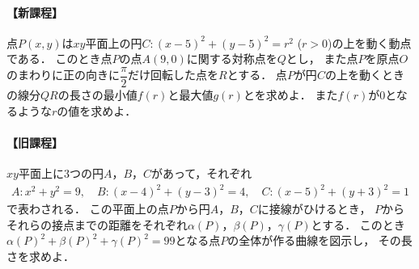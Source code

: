 \documentclass[../../main.tex]{subfiles}
\begin{document}
\paragraph{【新課程】}
点$P(x,y)$は$xy$平面上の円$C:(x-5)^2+(y-5)^2=r^2$ ($r>0$)の上を動く動点である．
このとき点$P$の点$A(9,0)$に関する対称点を$Q$とし，
また点$P$を原点$O$のまわりに正の向きに$\dfrac{\pi}{2}$だけ回転した点を$R$とする．
点$P$が円$C$の上を動くときの線分$QR$の長さの最小値$f(r)$と最大値$g(r)$とを求めよ．
また$f(r)$が$0$となるような$r$の値を求めよ．

\paragraph{【旧課程】}
$xy$平面上に3つの円$A$，$B$，$C$があって，それぞれ
\begin{align}
  A:x^2+y^2=9, \quad B:(x-4)^2+(y-3)^2=4, \quad C:(x-5)^2+(y+3)^2=1
\end{align}
で表わされる．
この平面上の点$P$から円$A$，$B$，$C$に接線がひけるとき，
$P$からそれらの接点までの距離をそれぞれ$\alpha(P)$，$\beta(P)$，$\gamma(P)$とする．
このとき${\alpha(P)}^2+{\beta(P)}^2+{\gamma(P)}^2=99$となる点$P$の全体が作る曲線を図示し，
その長さを求めよ．
\end{document}
